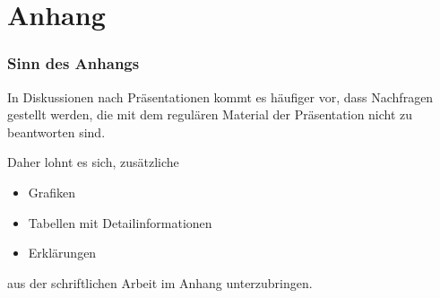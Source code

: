 \section{Anhang}

\begin{frame}
  \frametitle{Sinn des Anhangs}

  In Diskussionen nach Präsentationen kommt es häufiger vor, dass Nachfragen
  gestellt werden, die mit dem regulären Material der Präsentation nicht zu
  beantworten sind.

  Daher lohnt es sich, zusätzliche
  \begin{itemize}
    \item Grafiken
    \item Tabellen mit Detailinformationen
    \item Erklärungen
  \end{itemize}
  aus der schriftlichen Arbeit im Anhang unterzubringen.

\end{frame}
